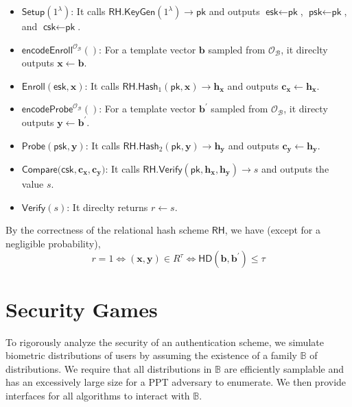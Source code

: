 \begin{itemize}

	\item $\textsf{Setup}(1^\lambda)$: It calls $\textsf{RH.KeyGen}(1^\lambda) \to \textsf{pk}$ and outputs $\textsf{esk} \gets \textsf{pk}$, $\textsf{psk} \gets \textsf{pk}$, and $\textsf{csk} \gets \textsf{pk}$.

	\item $\textsf{encodeEnroll}^{\mathcal{O}_{\mathcal{B}}}()$: For a template vector $\mathbf{b}$ sampled from $\mathcal{O}_\mathcal{B}$, it direclty outputs $\mathbf{x} \gets \mathbf{b}$.

	\item $\textsf{Enroll}(\textsf{esk}, \mathbf{x})$: It calls $\textsf{RH.Hash}_1(\textsf{pk}, \mathbf{x}) \to \mathbf{h_x}$ and outputs $\mathbf{c_x} \gets \mathbf{h_x}$.

	\item $\textsf{encodeProbe}^{\mathcal{O}_{\mathcal{B}}}()$: For a template vector $\mathbf{b}^\prime$ sampled from $\mathcal{O}_\mathcal{B}$, it directy outputs $\mathbf{y} \gets \mathbf{b}^\prime$.

	\item $\textsf{Probe}(\textsf{psk}, \mathbf{y})$: It calls $\textsf{RH.Hash}_2(\textsf{pk}, \mathbf{y}) \to \mathbf{h_y}$ and outputs $\mathbf{c_y} \gets \mathbf{h_y}$.

	\item $\textsf{Compare}(\textsf{csk}, \mathbf{c_x}, \mathbf{c_y)}$: It calls $\textsf{RH.Verify}(\textsf{pk}, \mathbf{h_x}, \mathbf{h_y}) \to s$ and outputs the value $s$.

	\item $\textsf{Verify}(s)$: It direclty returns $r \gets s$.

\end{itemize}

By the correctness of the relational hash scheme $\textsf{RH}$, we have (except for a negligible probability),
\[
	r = 1 \Leftrightarrow (\mathbf{x}, \mathbf{y}) \in R^\tau \Leftrightarrow \textsf{HD}(\mathbf{b}, \mathbf{b}^\prime) \leq \tau
\]




\section{Security Games}
\label{sec:security_game}

To rigorously analyze the security of an authentication scheme, we simulate biometric distributions of users by assuming the existence of a family $\mathbb{B}$ of distributions. We require that all distributions in $\mathbb{B}$ are efficiently samplable and has an excessively large size for a PPT adversary to enumerate. We then provide interfaces for all algorithms to interact with $\mathbb{B}$.

